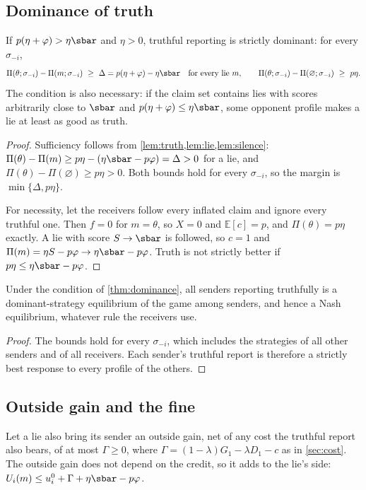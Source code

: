 \subsection{Dominance of truth}
\begin{theorem}
  \label{thm:dominance}
  If $p(\eta+\varphi)>\eta\sbar$ and $\eta>0$, truthful reporting is strictly dominant: for every $\sigma_{-i}$,
  \[
    \Pi(\theta;\sigma_{-i})-\Pi(m;\sigma_{-i})\ \ge\ \Delta=p(\eta+\varphi)-\eta\sbar\quad\text{for every lie } m,\qquad
    \Pi(\theta;\sigma_{-i})-\Pi(\varnothing;\sigma_{-i})\ \ge\ p\eta .
  \]
  The condition is also necessary: if the claim set contains lies with scores arbitrarily close to $\sbar$ and $p(\eta+\varphi)\le\eta\sbar$, some opponent profile makes a lie at least as good as truth.
\end{theorem}
\begin{proof}
  Sufficiency follows from \cref{lem:truth,lem:lie,lem:silence}: $\Pi(\theta)-\Pi(m)\ge p\eta-(\eta\sbar-p\varphi)=\Delta>0$ for a lie, and $\Pi(\theta)-\Pi(\varnothing)\ge p\eta>0$. Both bounds hold for every $\sigma_{-i}$, so the margin is $\min\{\Delta,p\eta\}$.

  For necessity, let the receivers follow every inflated claim and ignore every truthful one. Then $f=0$ for $m=\theta$, so $X=0$ and $\mathbb E[c]=p$, and $\Pi(\theta)=p\eta$ exactly. A lie with score $S\to\sbar$ is followed, so $c=1$ and $\Pi(m)=\eta S-p\varphi\to\eta\sbar-p\varphi$. Truth is not strictly better if $p\eta\le\eta\sbar-p\varphi$.
\end{proof}

\begin{corollary}
  \label{cor:equilibrium}
  Under the condition of \cref{thm:dominance}, all senders reporting truthfully is a dominant-strategy equilibrium of the game among senders, and hence a Nash equilibrium, whatever rule the receivers use.
\end{corollary}
\begin{proof}
  The bounds hold for every $\sigma_{-i}$, which includes the strategies of all other senders and of all receivers. Each sender's truthful report is therefore a strictly best response to every profile of the others.
\end{proof}

\subsection{Outside gain and the fine}
Let a lie also bring its sender an outside gain, net of any cost the truthful report also bears, of at most $\Gamma\ge0$, where $\Gamma=(1-\lambda)G_1-\lambda D_1-c$ as in \cref{sec:cost}. The outside gain does not depend on the credit, so it adds to the lie's side: $U_i(m)\le u_i^0+\Gamma+\eta\sbar-p\varphi$.

